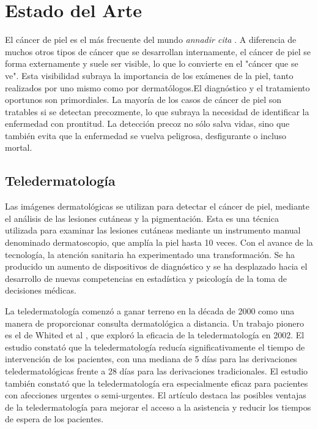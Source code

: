 \chapter{Estado del Arte}\label{chapter:state-of-the-art}

El cáncer de piel es el más frecuente del mundo \textit{annadir cita} . A diferencia de muchos otros tipos de cáncer que se 
desarrollan internamente, el cáncer de piel se forma externamente y suele ser visible, lo que lo convierte en el "cáncer que se ve". Esta visibilidad subraya 
la importancia de los exámenes de la piel, tanto realizados por uno mismo como por dermatólogos.El diagnóstico y el tratamiento oportunos son primordiales. 
La mayoría de los casos de cáncer de piel son tratables si se detectan precozmente, lo que subraya la necesidad de identificar la enfermedad con prontitud. 
La detección precoz no sólo salva vidas, sino que también evita que la enfermedad se vuelva peligrosa, desfigurante o incluso mortal.

\section*{Teledermatología}

Las imágenes dermatológicas se utilizan para detectar el cáncer de piel, mediante el análisis de las lesiones cutáneas y la pigmentación. Esta es una técnica 
utilizada para examinar las lesiones cutáneas mediante un instrumento manual denominado dermatoscopio, que amplía la piel hasta 10 veces. Con el avance de la 
tecnología, la atención sanitaria ha experimentado una transformación. Se ha producido un aumento de dispositivos de diagnóstico y se ha desplazado hacia el 
desarrollo de nuevas competencias en estadística y psicología de la toma de decisiones médicas.

La teledermatología comenzó a ganar terreno en la década de 2000 como una manera de proporcionar consulta dermatológica a distancia. Un trabajo pionero 
es el de Whited et al \cite{whited2002teledermatology}, que exploró la eficacia de la teledermatología en 2002. El estudio constató que la teledermatología 
reducía significativamente el tiempo de intervención de los pacientes, con una mediana de 5 días para las derivaciones teledermatológicas frente a 28 días para 
las derivaciones tradicionales. El estudio también constató que la teledermatología era especialmente eficaz para pacientes con afecciones urgentes o semi-urgentes. 
El artículo destaca las posibles ventajas de la teledermatología para mejorar el acceso a la asistencia y reducir los tiempos de espera de los pacientes.


